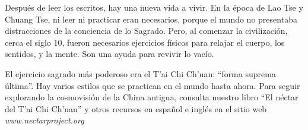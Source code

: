 \documentclass[book,b5paper,hidelinks,final]{memoir}
\begin{document}
	Después de leer los escritos, hay una nueva vida a vivir. En la época de
	Lao Tse y Chuang Tse, ni leer ni practicar eran necesarios, porque el
	mundo no presentaba distracciones de la conciencia de lo Sagrado. Pero,
	al comenzar la civilización, cerca el siglo 10, fueron necesarios
	ejercicios físicos para relajar el cuerpo, los sentidos, y la mente. Son
	una ayuda para revivir lo vacío.
	
	El ejercicio sagrado más poderoso era el T'ai Chi Ch'uan: ``forma
	suprema última''. Hay varios estilos que se practican en el mundo hasta
	ahora. Para seguir explorando la cosmovisión de la China antigua,
	consulta nuestro libro ``El néctar del T'ai Chi Ch'uan'' y otros
	recursos en español e inglés en el sitio web
	\textit{www.nectarproject.org}
	
\end{document}
